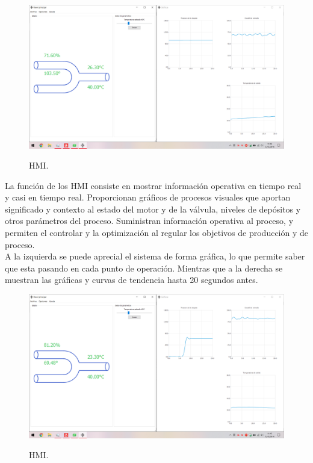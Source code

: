 \documentclass[12pt]{article}
\begin{document}
\begin{figure}[H]
\centering
\includegraphics[scale=0.25]{src/imagenes/HMI_1.png}
\label{fgr:HMI_1}
\caption{HMI.}
\end{figure}

La función de los HMI consiste en mostrar información operativa en tiempo real y casi en tiempo real. Proporcionan gráficos de procesos visuales que aportan significado y contexto al estado del motor y de la válvula, niveles de depósitos y otros parámetros del proceso. Suministran información operativa al proceso, y permiten el controlar y la optimización al regular los objetivos de producción y de proceso. \\

A la izquierda se puede aprecial el sistema de forma gráfica, lo que permite saber que esta pasando en cada punto de operación. Mientras que a la derecha se muestran las gráficas y curvas de tendencia hasta 20 segundos antes.

\begin{figure}[H]
\centering
\includegraphics[scale=0.25]{src/imagenes/HMI_2.png}
\label{fgr:HMI_2}
\caption{HMI.}
\end{figure}
\end{document}
